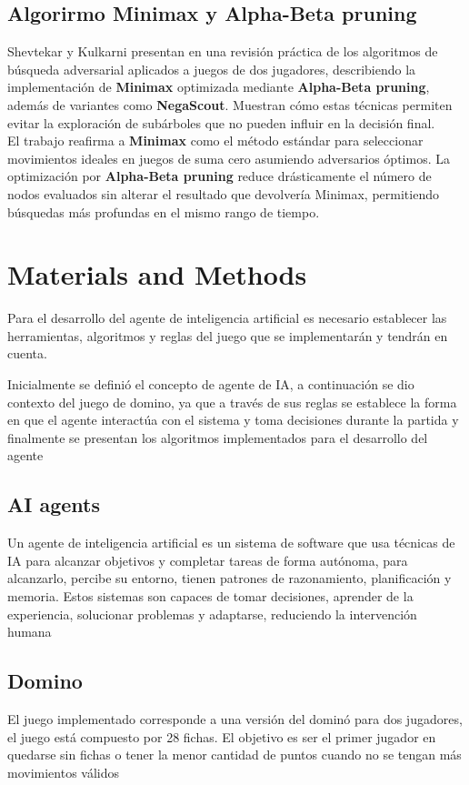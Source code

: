 \documentclass[journal,onecolumn]{IEEEtran}
\begin{document}
\subsection{Algorirmo Minimax y Alpha-Beta pruning}
Shevtekar y Kulkarni presentan en \cite{kulkarni2022minimax} una revisión práctica de los algoritmos de búsqueda adversarial aplicados a juegos de dos jugadores, describiendo la implementación de \textbf{Minimax} optimizada mediante \textbf{Alpha-Beta pruning}, además de variantes como \textbf{NegaScout}. Muestran cómo estas técnicas permiten evitar la exploración de subárboles que no pueden influir en la decisión final.\\
El trabajo reafirma a \textbf{Minimax} como el método estándar para seleccionar movimientos ideales en juegos de suma cero asumiendo adversarios óptimos. La optimización por \textbf{Alpha-Beta pruning} reduce drásticamente el número de nodos evaluados sin alterar el resultado que devolvería Minimax, permitiendo búsquedas más profundas en el mismo rango de tiempo.


\section{Materials and Methods}
Para el desarrollo del agente de inteligencia artificial es necesario establecer las herramientas, algoritmos y reglas del juego que se implementarán y tendrán en cuenta. 

Inicialmente se definió el concepto de agente de IA, a continuación se dio contexto del juego de domino, ya que a través de sus reglas se establece la forma en que el agente interactúa con el sistema y toma decisiones durante la partida y finalmente se presentan los algoritmos implementados para el desarrollo del agente


\subsection{ AI agents}
Un agente de inteligencia artificial es un sistema de software que usa técnicas de IA para alcanzar objetivos y completar tareas de forma autónoma, para alcanzarlo, percibe su entorno, tienen patrones de razonamiento, planificación y memoria. Estos sistemas son capaces de tomar decisiones, aprender de la experiencia, solucionar problemas  y adaptarse, reduciendo la intervención humana \cite{akerkar}

\subsection{ Domino }
El juego implementado corresponde a una versión del dominó para dos jugadores, el juego está compuesto por 28 fichas. El objetivo es ser el primer jugador en quedarse sin fichas o tener la menor cantidad de puntos cuando no se tengan más movimientos válidos \cite{RuibalDomino2015}
\end{document}
